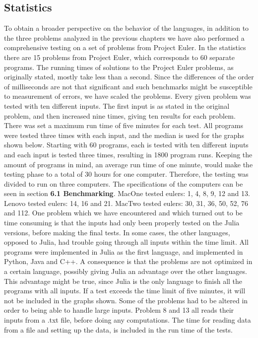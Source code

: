 \documentclass[a4paper, 11pt, titlepage]{article}
\begin{document}
\subsection{Statistics}
To obtain a broader perspective on the behavior of the languages, in addition to the three problems analyzed in the previous chapters we have also performed a comprehensive testing on a set of problems from Project Euler.
In the statistics there are 15 problems from Project Euler, which corresponds to 60 separate programs. The running times of solutions to the Project Euler problems, as originally stated, mostly take less than a second. Since the differences of the order of milliseconds are not that significant and such benchmarks might be susceptible to measurement of errors, we have scaled the problems. Every given problem was tested with ten different inputs. The first input is as stated in the original problem, and then increased nine times, giving ten results for each problem. There was set a maximum run time of five minutes for each test. All programs were tested three times with each input, and the median is used for the graphs shown below. 
Starting with 60 programs, each is tested with ten different inputs and each input is tested three times, resulting in 1800 program runs. Keeping the amount of programs in mind, an average run time of one minute, would make the testing phase to a total of 30 hours for one computer. 
Therefore, the testing was divided to run on three computers. The specifications of the computers can be seen in section \textbf{6.1 Benchmarking}. MacOne tested eulers: 1, 4, 8, 9, 12 and 13. Lenovo tested eulers: 14, 16 and 21. MacTwo tested eulers: 30, 31, 36, 50, 52, 76 and 112.
One problem which we have encountered and which turned out to be time consuming is that the inputs had only been properly tested on the Julia versions, before making the final tests. In some cases, the other languages, opposed to Julia, had trouble going through all inputs within the time limit. All programs were implemented in Julia as the first language, and implemented in Python, Java and C++. A consequence is that the problems are not optimized in a certain language, possibly giving Julia an advantage over the other languages. This advantage might be true, since Julia is the only language to finish all the programs with all inputs.
If a test exceeds the time limit of five minutes, it will not be included in the graphs shown.
Some of the problems had to be altered in order to being able to handle large inputs. Problem 8 and 13 all reads their inputs from a .txt file, before doing any computations. The time for reading data from a file and setting up the data, is included in the run time of the tests.
\end{document}
